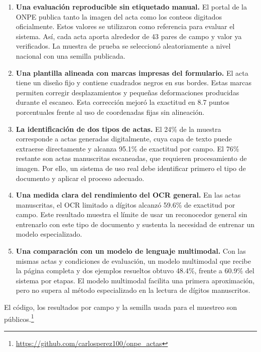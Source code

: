 \documentclass[conference]{IEEEtran}
\begin{document}
\begin{enumerate}
\item \textbf{Una evaluaci\'on reproducible sin etiquetado manual.} El portal
de la ONPE publica tanto la imagen del acta como los conteos digitados
oficialmente. Estos valores se utilizaron como referencia para evaluar el
sistema. As\'i, cada acta aporta alrededor de 43 pares de campo y valor ya
verificados. La muestra de prueba se seleccion\'o aleatoriamente a nivel
nacional con una semilla publicada.

\item \textbf{Una plantilla alineada con marcas impresas del formulario.} El
acta tiene un dise\~no fijo y contiene cuadrados negros en sus bordes. Estas
marcas permiten corregir desplazamientos y peque\~nas deformaciones producidas
durante el escaneo. Esta correcci\'on mejor\'o la exactitud en 8.7 puntos
porcentuales frente al uso de coordenadas fijas sin alineaci\'on.

\item \textbf{La identificaci\'on de dos tipos de actas.} El 24\% de la muestra
corresponde a actas generadas digitalmente, cuya capa de texto puede extraerse
directamente y alcanza 95.1\% de exactitud por campo. El 76\% restante son
actas manuscritas escaneadas, que requieren procesamiento de imagen. Por ello,
un sistema de uso real debe identificar primero el tipo de documento y aplicar
el proceso adecuado.

\item \textbf{Una medida clara del rendimiento del OCR general.} En las actas
manuscritas, el OCR limitado a d\'igitos alcanz\'o 59.6\% de exactitud por
campo. Este resultado muestra el l\'imite de usar un reconocedor general sin
entrenarlo con este tipo de documento y sustenta la necesidad de entrenar un
modelo especializado.

\item \textbf{Una comparaci\'on con un modelo de lenguaje multimodal.} Con las
mismas actas y condiciones de evaluaci\'on, un modelo multimodal que recibe la
p\'agina completa y dos ejemplos resueltos obtuvo 48.4\%, frente a 60.9\% del
sistema por etapas. El modelo multimodal facilita una primera aproximaci\'on,
pero no supera al m\'etodo especializado en la lectura de d\'igitos manuscritos.
\end{enumerate}

El c\'odigo, los resultados por campo y la semilla usada para el muestreo son
p\'ublicos.\footnote{\url{https://github.com/carlosperez100/onpe_actas}}
\end{document}
